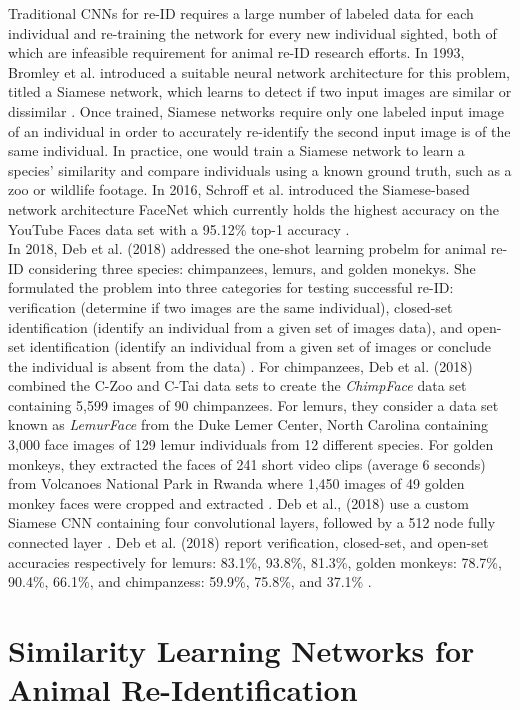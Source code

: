 \documentclass[11pt]{article}
\begin{document}
Traditional CNNs for re-ID requires a large number of labeled data for each individual and re-training the network for every new individual sighted, both of which are infeasible requirement for animal re-ID research efforts. In 1993, Bromley et al. introduced a suitable neural network architecture for this problem, titled a Siamese network, which learns to detect if two input images are similar or dissimilar \cite{bromley1994signature}. Once trained, Siamese networks require only one labeled input image of an individual in order to accurately re-identify the second input image is of the same individual. In practice, one would train a Siamese network to learn a species' similarity and compare individuals using a known ground truth, such as a zoo or wildlife footage. In 2016, Schroff et al. introduced the Siamese-based network architecture FaceNet which currently holds the highest accuracy on the YouTube Faces data set with a 95.12\% top-1 accuracy \cite{schroff2015facenet}. 
\newline
\\
In 2018, Deb et al. (2018) addressed the one-shot learning probelm for animal re-ID considering three species: chimpanzees, lemurs, and golden monekys. She formulated the problem into three categories for testing successful re-ID: verification (determine if two images are the same individual), closed-set identification (identify an individual from a given set of images data), and open-set identification (identify an individual from a given set of images or conclude the individual is absent from the data) \cite{deb2018face}. For chimpanzees, Deb et al. (2018) combined the C-Zoo and C-Tai data sets to create the \textit{ChimpFace} data set containing 5,599 images of 90 chimpanzees. For lemurs, they consider a data set known as \textit{LemurFace} from the Duke Lemer Center, North Carolina containing 3,000 face images of 129 lemur individuals from 12 different species. For golden monkeys, they extracted the faces of 241 short video clips (average 6 seconds) from Volcanoes National Park in Rwanda where 1,450 images of 49 golden monkey faces were cropped and extracted \cite{deb2018face}. Deb et al., (2018) use a custom Siamese CNN containing four convolutional layers, followed by a 512 node fully connected layer \cite{deb2018face}. Deb et al. (2018) report verification, closed-set, and open-set accuracies respectively for lemurs: 83.1\%, 93.8\%, 81.3\%, golden monkeys: 78.7\%, 90.4\%, 66.1\%, and chimpanzess: 59.9\%, 75.8\%, and 37.1\% \cite{deb2018face}. 


\section*{Similarity Learning Networks for Animal Re-Identification}
\end{document}
